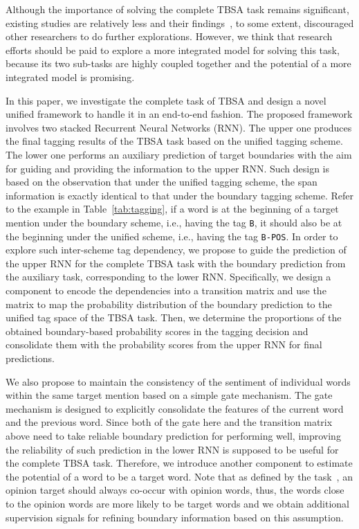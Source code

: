 \documentclass[letterpaper]{article} \usepackage{aaai19}  \usepackage{times}  \usepackage{helvet}  \usepackage{courier}  \usepackage{url}  \usepackage{graphicx}  \frenchspacing  \setlength{\pdfpagewidth}{8.5in}  \setlength{\pdfpageheight}{11in}
\begin{document}
Although the importance of solving the complete TBSA task remains significant, existing studies are relatively less and their findings~\cite{D13-1171,D15-1073}, to some extent, discouraged other researchers to do further explorations. However, we think that research efforts should be paid to explore a more integrated model for solving this task, because its two sub-tasks are highly coupled together and the potential of a more integrated model is promising.  


In this paper, we investigate the complete task of TBSA and design a novel unified framework to handle it in an end-to-end fashion. The proposed framework involves two stacked Recurrent Neural Networks (RNN). The upper one produces the final tagging results of the TBSA task based on the unified tagging scheme. The lower one performs an auxiliary prediction of target boundaries with the aim for guiding and providing the information to the upper RNN. 
Such design is based on the observation that under the unified tagging scheme, the span information is exactly identical to that under the boundary tagging scheme. Refer to the example in Table~\ref{tab:tagging}, if a word is at the beginning of a target mention under the boundary scheme, i.e., having the tag \texttt{B}, it should also be at the beginning under the unified scheme, i.e., having the tag \texttt{B-POS}. In order to explore such inter-scheme tag dependency, we propose to guide the prediction of the upper RNN for the complete TBSA task with the boundary prediction from the auxiliary task, corresponding to the lower RNN. Specifically, we design a component to encode the dependencies into a transition matrix and use the matrix to map the probability distribution of the boundary prediction to the unified tag space of the TBSA task. Then, we determine the proportions of the obtained boundary-based probability scores in the tagging decision and consolidate them with the probability scores from the upper RNN for final predictions.

We also propose to maintain the consistency of the sentiment of individual words within the same target mention based on a simple gate mechanism. The gate mechanism is designed to explicitly consolidate the features of the current word and the previous word. Since both of the gate here and the transition matrix above need to take reliable boundary prediction for performing well, improving the reliability of such prediction in the lower RNN is supposed to be useful for the complete TBSA task. Therefore, we introduce another component to estimate the potential of a word to be a target word.
Note that as defined by the task~\cite{S14-2004,S15-2082,S16-1002}, an opinion target should always co-occur with opinion words, thus, the words close to the opinion words are more likely to be target words and we obtain additional supervision signals for refining boundary information based on this assumption.
\end{document}
